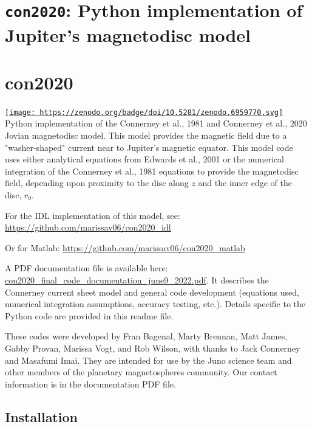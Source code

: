 	\section{\texttt{con2020}: Python implementation of Jupiter's magnetodisc model}

	\section{con2020}

	\href{https://zenodo.org/badge/doi/10.5281/zenodo.6959770.svg}{\texttt{[image: https://zenodo.org/badge/doi/10.5281/zenodo.6959770.svg]}} \\
	Python implementation of the Connerney et al., 1981 and Connerney et al., 2020 Jovian magnetodisc model. This model provides the magnetic field due to a "washer-shaped" current near to Jupiter's magnetic equator. This model code uses either analytical equations from Edwards et al., 2001 or the numerical integration of the Connerney et al., 1981 equations to provide the magnetodisc field, depending upon proximity to the disc along $z$ and the inner edge of the disc, $r_0$.
	
	For the IDL implementation of this model, see:
	\href{https://github.com/marissav06/con2020_idl}{https://github.com/marissav06/con2020_idl}
	
	Or for Matlab:
	\href{https://github.com/marissav06/con2020_matlab}{https://github.com/marissav06/con2020_matlab}
	
	A PDF documentation file is available here: \href{https://github.com/gabbyprovan/con2020/files/8869108/con2020_final_code_documentation_june9_2022.pdf}{con2020_final_code_documentation_june9_2022.pdf}. It describes the Connerney current sheet model and general code development (equations used, numerical integration assumptions, accuracy testing, etc.). Details specific to the Python code are provided in this readme file.
	
	These codes were developed by Fran Bagenal, Marty Brennan, Matt James, Gabby Provan, Marissa Vogt, and Rob Wilson, with thanks to Jack Connerney and Masafumi Imai. They are intended for use by the Juno science team and other members of the planetary magnetospheres community. Our contact information is in the documentation PDF file.
	
	\subsection{Installation}
	
